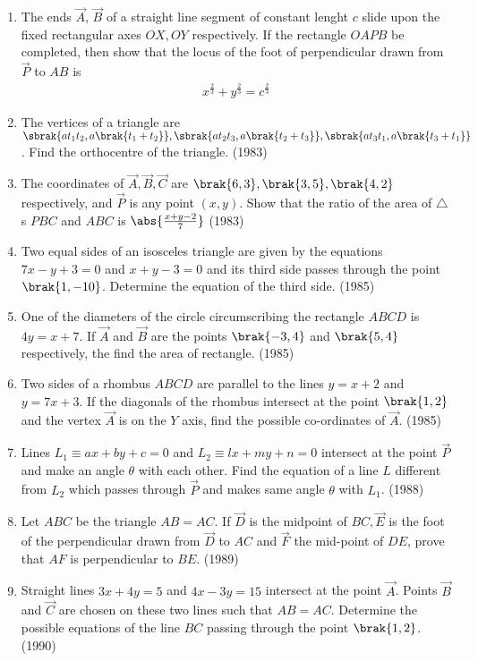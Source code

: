 \begin{enumerate}
\item The ends $\vec{A}$, $\vec{B}$ of a straight line segment of constant lenght $c$ slide upon the fixed rectangular axes $ OX, OY$ respectively. If the rectangle $OAPB$ be completed, then show that the locus of the foot of perpendicular drawn from $\vec{P}$ to $AB$ is 
 \begin{align*}  x^\frac{2}{3} + y^\frac{2}{3} = c^\frac{2}{3} \end{align*}
  \item The vertices of a triangle are $\sbrak{ at_1t_2,a\brak{t_1+t_2}}, \sbrak{ at_2t_3,a\brak{t_2+t_3}},\sbrak{at_3t_1,a\brak{t_3+t_1}}$. Find the orthocentre of the triangle. \hfill{(1983)}
  \item The coordinates of $\vec{A},\vec{B},\vec{C}$ are $ \brak{6,3}, \brak{3,5}, \brak{4,2} $ respectively, and $\vec{P}$ is any point $(x,y)$.
Show that the ratio of the area of $\triangle$s $PBC$  and $ABC$ is $\abs{\frac{x+y-2}{7}}$ \hfill{(1983)} 
%
\item Two equal sides of an isosceles triangle are given by the equations $7x-y+3=0$ and $x+y-3=0$ and its third side passes through the point $\brak{1,-10}$. Determine the equation of the third side.  \hfill{(1985)}
%
\item One of the diameters of the circle circumscribing the rectangle $ABCD$ is $4y=x+ 7$. If $\vec{A}$ and $\vec{B}$ are the points $\brak{-3,4}$ and $\brak{5,4}$ respectively, the find the area of rectangle.  \hfill{(1985)}
%
\item Two sides of a rhombus $ABCD$ are parallel to the lines $y=x+2$ and $y=7x+3$. If the diagonals of the rhombus intersect at the point $\brak{1,2}$ and the vertex $\vec{A}$ is on the $Y$ axis, find the possible co-ordinates of $\vec{A}$.     \hfill{(1985)} 
%
\item Lines $ L_1 \equiv ax+by+c =0 $ and $ L_2 \equiv lx+my+n =0 $ intersect at the point $\vec{P}$ and make an angle $\theta$ with each other. Find the equation of a line $L$ different from $L_2$ which passes through $\vec{P}$ and makes same angle $\theta$ with $L_1$. \hfill{(1988)}
%
\item Let $ABC$ be the triangle $AB=AC$. If $\vec{D}$ is the midpoint of $ BC, \vec{E}$ is the foot of the perpendicular drawn from $\vec{D}$ to $AC$ and $\vec{F}$ the mid-point of $DE$, prove that $AF$ is perpendicular to $BE$. \hfill{(1989)}
%
\item Straight lines $3x + 4y =5$ and $ 4x-3y= 15$ intersect at the point $\vec{A}$. Points $\vec{B}$ and $\vec{C}$ are chosen on these two lines such that $AB=AC$. Determine the possible equations of the line $BC$ passing through the point $\brak{1,2}$. \hfill{(1990)}

\end{enumerate}
